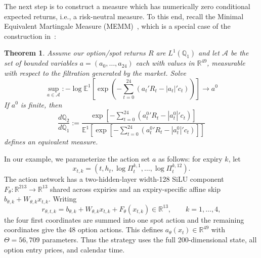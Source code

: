 \documentclass[11pt,a4paper]{article}
\newtheorem{theorem}[definition]{Theorem}
\newcommand{\R}{\mathbb{R}}
\newcommand{\E}{\mathbb{E}}
\newcommand{\Q}{\mathbb{Q}}
\newcommand{\calA}{\mathcal{A}}
\renewcommand{\Q}{\mathbb{Q}}
\DeclareRobustCommand{\eqlabel}[1]{\label{eq:#1}}                                     %
\DeclareRobustCommand{\eq}[1]{\begin{equation}\eqlabel{#1}}                           %
\DeclareRobustCommand{\eqend}{\end{equation}}                                         %
\begin{document}
The next step is to construct a measure which has numerically zero conditional
expected returns, i.e., a risk-neutral measure.  To this end, recall the
Minimal Equivalent Martingale Measure (MEMM)~\citep{MEMM}, which is a special
case of the construction in~\citet{removedrift}:

\begin{theorem}
Assume our option/spot returns $R$ are $L^1(\Q_1)$ and let $\calA$ be the set of bounded variables $a=(a_0,\ldots,a_{24})$
each with values in  $\R^{49}$, measurable with respect to the filtration generated by the market.
Solve
\eq{rn-oce-general}
  \sup_{a\in\calA}:
  -\log\E^1\left[
    \exp\left(
      -\sum_{t=0}^{24}\left(a_t'R_t-|a_t|'c_t\right)
    \right)
  \right]
  \longrightarrow a^0
\eqend
If $a^0$ is finite, then
\eq{densit1}
  \frac{d\Q_2}{d\Q_1}
  :=\frac{
    \exp\left[-\sum_{t=0}^{24}\left({a_t^0}'R_t-|a_t^0|'c_t\right)\right]
  }{
    \E^1\left[
      \exp\left[-\sum_{t=0}^{24}\left({a_t^0}'R_t-|a_t^0|'c_t\right)\right]
    \right]
  }
\eqend
defines an equivalent measure.
\end{theorem}

In our example, we parameterize the action set $a$ as follows:
for expiry $k$, let
\[
  x_{t,k}=(t,h_t,\log\Pi_t^{k,1},\ldots,\log\Pi_t^{k,12}).
\]
The action network has a two-hidden-layer width-128 SiLU component
$F_\theta:\R^{213}\to\R^{13}$ shared across expiries and an
expiry-specific affine skip $b_{\theta,k}+W_{\theta,k}x_{t,k}$.  Writing
\begin{equation}
  r_{\theta,t,k}=b_{\theta,k}+W_{\theta,k}x_{t,k}
    +F_\theta(x_{t,k})\in\R^{13},
  \qquad k=1,\ldots,4,
  \label{eq:rn-expiry-action}
\end{equation}
the four first coordinates are summed into one spot action and the remaining
coordinates give the 48 option actions.  This defines
$a_\theta(x_t)\in\R^{49}$ with $\Theta=56{,}709$ parameters.  Thus the
strategy uses the full 200-dimensional state, all option entry prices, and
calendar time.
\end{document}

